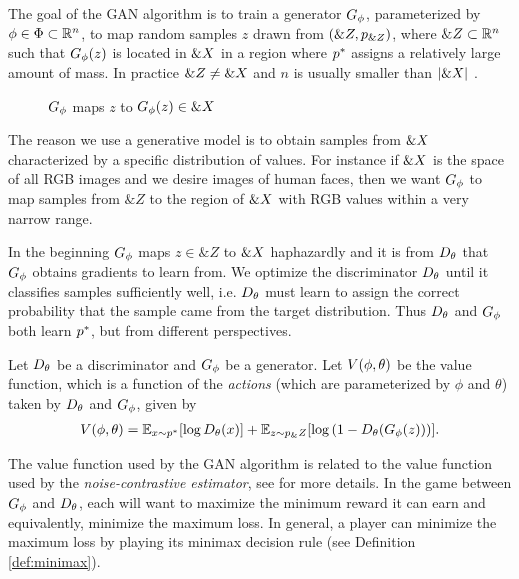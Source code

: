 The goal of the GAN algorithm is to train a generator $G_\phi$,
parameterized by $\phi \in \Phi \subset \mathbb{R}^n$, to map random samples
$z$ drawn from $(\&Z, p_{\&Z})$, where $\&Z \subset \mathbb{R}^n$
such that $G_\phi(z)$ is located in $\&X$ in a region where $p^*$
assigns a relatively large amount of mass. In practice
$\&Z \not = \&X$ and $n$ is usually smaller than $|\&X|$
\cite{ref:arjovsky-2017}.

\begin{figure}[H] \centering
  \caption{$G_\phi$ maps $z$ to $G_\phi(z) \in \&X$}
  \label{fig:g-maps}
\end{figure}

The reason we use a generative model is to obtain samples from
$\&X$ characterized by a specific distribution of values. For
instance if $\&X$ is the space of all RGB images and we desire
images of human faces, then we want $G_\phi$ to map samples from $\&Z$ to
the region of $\&X$ with RGB values within a very narrow range.

In the beginning $G_\phi$ maps $z \in \&Z$ to $\&X$ haphazardly and
it is from $D_\theta$ that $G_\phi$ obtains gradients to learn from. We optimize
the discriminator $D_\theta$ until it classifies samples sufficiently well,
i.e. $D_\theta$ must learn to assign the correct probability that the sample
came from the target distribution. Thus $D_\theta$ and $G_\phi$ both learn
$p^*$, but from different perspectives.

Let $D_\theta$ be a discriminator and $G_\phi$ be a generator. Let $V(\phi, \theta)$ be the
value function, which is a function of the \textit{actions} (which are
parameterized by $\phi$ and $\theta$) taken by $D_\theta$ and $G_\phi$, given by
\begin{align}
  \label{eq:the-original-objective-function}
  V(\phi, \theta) = \mathbb{E}_{x \sim p^*}[{\log D_\theta(x})] +
  \mathbb{E}_{z \sim p_\&Z}[\log{(1 - D_\theta(G_\phi(z)))}].
\end{align}

The value function used by the GAN algorithm is related to the value
function used by the \textit{noise-contrastive estimator}, see
\cite{ref:gutmann-2010} for more details. In the game between $G_\phi$ and
$D_\theta$, each will want to maximize the minimum reward it can earn and
equivalently, minimize the maximum loss. In general, a player can
minimize the maximum loss by playing its minimax decision rule (see
Definition \ref{def:minimax}).

